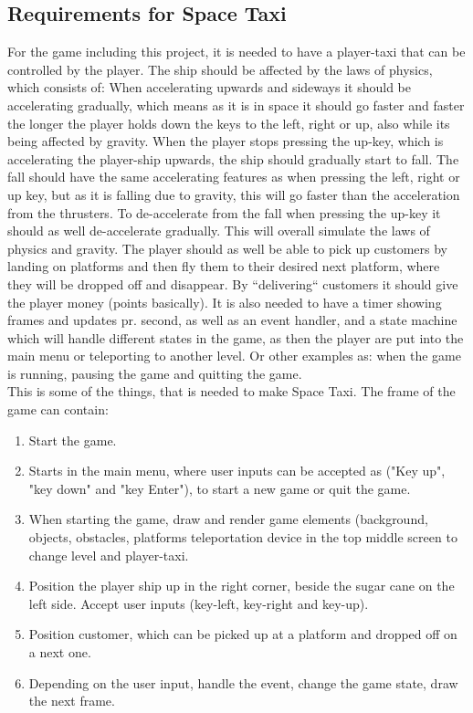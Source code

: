 \documentclass[../master.tex]{subfiles}
\begin{document}
\subsection{Requirements for Space Taxi}
\label{sec:Requirements}
For the game including this project, it is needed to have a player-taxi that can be controlled by the player. The ship should be affected by the laws of physics, which consists of: When accelerating upwards and sideways it should be accelerating gradually, which means as it is in space it should go faster and faster the longer the player holds down the keys to the left, right or up, also while its being affected by gravity. When the player stops pressing the up-key, which is accelerating the player-ship upwards, the ship should gradually start to fall. The fall should have the same accelerating features as when pressing the left, right or up key, but as it is falling due to gravity, this will go faster than the acceleration from the thrusters. To de-accelerate from the fall when pressing the up-key it should as well de-accelerate gradually. This will overall simulate the laws of physics and gravity. The player should as well be able to pick up customers by landing on platforms and then fly them to their desired next platform, where they will be dropped off and disappear. By ``delivering`` customers it should give the player money (points basically). It is also needed to have a timer showing frames and updates pr. second, as well as an event handler, and a state machine which will handle different states in the game, as then the player are put into the main menu or teleporting to another level. Or other examples as: when the game is running, pausing the game and quitting the game.\\

This is some of the things, that is needed to make Space Taxi. The frame of the game can contain:
\begin{enumerate}
	\item Start the game.
	\item Starts in the main menu, where user inputs can be accepted as ("Key up", "key down" and "key Enter"), to start a new game or quit the game.
	\item When starting the game, draw and render game elements (background, objects, obstacles, platforms teleportation device in the top middle screen to change level and player-taxi.
	\item Position the player ship up in the right corner, beside the sugar cane on the left side. Accept user inputs (key-left, key-right and key-up).
    \item Position customer, which can be picked up at a platform and dropped off on a next one.
	\item Depending on the user input, handle the event, change the game state, draw the next frame.
\end{enumerate}
\end{document}
